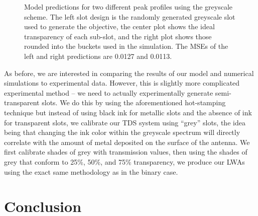 \documentclass[11pt]{article}
\begin{document}
\begin{figure}[H]
	\centering
	\caption{Model predictions for two different peak profiles using the greyscale scheme. The left slot design is the randomly generated greyscale slot used to generate the objective, the center plot shows the ideal transparency of each sub-slot, and the right plot shows those rounded into the buckets used in the simulation. The MSEs of the left and right predictions are 0.0127 and 0.0113.}
\end{figure}

\noindent As before, we are interested in comparing the results of our model and numerical simulations to experimental data. However, this is slightly more complicated experimental method -- we need to actually experimentally generate semi-transparent slots. We do this by using the aforementioned hot-stamping technique but instead of using black ink for metallic slots and the absence of ink for transparent slots, we calibrate our TDS system using ``grey'' slots, the idea being that changing the ink color within the greyscale spectrum will directly correlate with the amount of metal deposited on the surface of the antenna. We first calibrate shades of grey with transmission values, then using the shades of grey that conform to 25\%, 50\%, and 75\% transparency, we produce our LWAs using the exact same methodology as in the binary case.

\section*{Conclusion}



\end{document}
